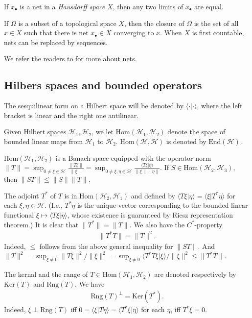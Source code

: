 \documentclass[12pt,a4paper,notitlepage]{article}
\theoremstyle{definition}
\theoremstyle{plain}
\newcommand{\mc}{\mathcal}
\newcommand{\End}{\mathrm{End}} %
\newcommand{\Hom}{\mathrm{Hom}}
\newcommand{\bk}[1]{\langle {#1}\rangle}
\newcommand{\blt}{\bullet}
\newcommand{\Ker}{\mathrm{Ker}}
\newcommand{\Rng}{\mathrm{Rng}}
\numberwithin{equation}{section}
\begin{document}
If $x_\blt$ is a net in a \textit{Hausdorff space} $X$, then any two limits of $x_\blt$ are equal.

If $\Omega$ is a subset of a topological space $X$, then the closure of $\Omega$ is the set of all $x\in X$ such that there is net $x_\blt\in X$ converging to $x$. When $X$ is first countable, nets can be replaced by sequences.

We refer the readers to \cite[Chapter 3]{Mun} for more  about nets.

\subsection*{Hilbers spaces and bounded operators}

The sesquilinear form on a Hilbert space will be denoted by $\bk{\cdot|\cdot}$, where the left bracket is linear and the right one antilinear. 

Given Hilbert spaces $\mc H_1,\mc H_2$, we let $\Hom(\mc H_1,\mc H_2)$ \index{Hom@$\Hom(\mc H_1,\mc H_2)$} denote the space of bounded linear maps from $\mc H_1$ to $\mc H_2$. $\Hom(\mc H,\mc H)$ is denoted by $\End(\mc H)$.\index{End@$\End(\mc H)$} 

$\Hom(\mc H_1,\mc H_2)$ is a Banach space equipped with the operator norm $\lVert T\lVert=\sup_{0\neq\xi\in\mc H} \frac{\lVert T\xi\lVert}{\lVert\xi\lVert}=\sup_{0\neq\xi,\eta\in\mc H}\frac {\bk{T\xi|\eta}}{\lVert\xi\lVert \lVert\eta\lVert}$. If $S\in\Hom(\mc H_2,\mc H_3)$, then $\lVert ST\lVert\leq\lVert S\lVert \lVert T\lVert$.

The adjoint $T^*$ of $T$ is in $\Hom(\mc H_2,\mc H_1)$ and defined by $\bk{T\xi|\eta}=\bk{\xi|T^*\eta}$ for each $\xi,\eta\in\mc H$. (I.e., $T^*\eta$ is the unique vector corresponding to the bounded linear functional $\xi\mapsto\bk{T\xi|\eta}$, whose existence is guaranteed by Riesz representation theorem.) It is clear that $\lVert T^*\lVert=\lVert T\lVert$. We also have the $C^*$-property
\begin{align}\label{eq3}
	\lVert T^*T\lVert=\lVert T\lVert^2.
\end{align}
Indeed, $\leq$ follows from the above general inequality for $\lVert ST\lVert$. And $\lVert T\lVert^2=\sup_{\xi\neq 0} \lVert T\xi\lVert^2/\lVert\xi\lVert^2=\sup_{\xi\neq 0} \bk{T^*T\xi|\xi}/\lVert\xi\lVert^2\leq \lVert T^*T\lVert$.




The kernal and the range of $T\in\Hom(\mc H_1,\mc H_2)$ are denoted respectively by $\Ker(T)$ and $\Rng(T)$. We have
\begin{align}
\Rng(T)^\perp=\Ker (T^*).\label{eq19}	
\end{align}
Indeed, $\xi\perp\Rng(T)$ iff $0=\bk{\xi|T\eta}=\bk{T^*\xi|\eta}$ for each $\eta$, iff $T^*\xi=0$.
\end{document}
